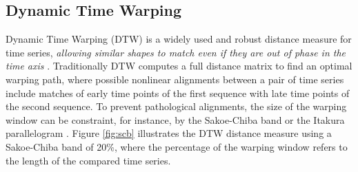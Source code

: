 \subsection{Dynamic Time Warping} \label{dynamic_time_warping}

Dynamic Time Warping (DTW) is a widely used and robust distance measure for time series, \textit{allowing similar shapes to match even if they are out of phase in the time axis} \cite{keogh2002exact}. Traditionally DTW computes a full distance matrix to find an optimal warping path, where possible nonlinear alignments between a pair of time series include matches of early time points of the first sequence with late time points of the second sequence. To prevent pathological alignments, the size of the warping window can be constraint, for instance, by the Sakoe-Chiba band \cite{sakoe1978dynamic} or the Itakura parallelogram \cite{itakura1975minimum}. Figure \ref{fig:scb} illustrates the DTW distance measure using a Sakoe-Chiba band of 20\%, where the percentage of the warping window refers to the length of the compared time series. 

